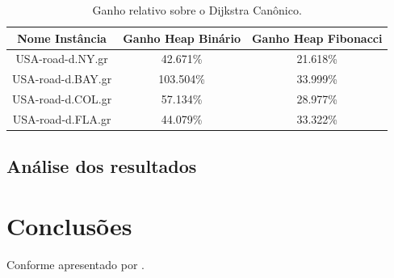 \begin{table}[H]
\caption{Ganho relativo sobre o Dijkstra Canônico.}
\label{tbl-dijkstra-resultados-speedup}
\centering
\begin{adjustbox}{max width=\textwidth}
\begin{tabular}{|c|c|c|}
\hline
\textbf{Nome Instância} & \textbf{Ganho Heap Binário} & \textbf{Ganho Heap Fibonacci} \\ \hline
USA-road-d.NY.gr        & 42.671\%                       & 21.618\%                         \\ \hline
USA-road-d.BAY.gr       & 103.504\%                      & 33.999\%                         \\ \hline
USA-road-d.COL.gr       & 57.134\%                       & 28.977\%                         \\ \hline
USA-road-d.FLA.gr       & 44.079\%                       & 33.322\%                         \\ \hline
\end{tabular}
\end{adjustbox}
\end{table}

\subsection{Análise dos resultados}
\label{sec-dijkstra-experimentos-analise}


\section{Conclusões}
\label{sec-dijkstra-conclusoes}
Conforme apresentado por .